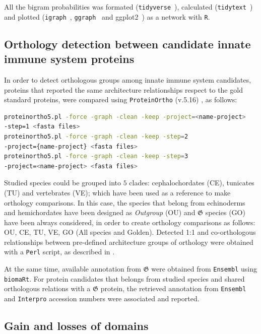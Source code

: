 \documentclass[11pt]{article}
\begin{document}
All the bigram probabilities was formated (\texttt{tidyverse}~\cite{wickham:2017}), calculated 
(\texttt{tidytext}~\cite{Wickham:2016}) and plotted (\texttt{igraph}~\cite{Csardi:2006}, 
\texttt{ggraph}~\cite{Pedersen:2018} and ggplot2~\cite{Wickham:2016a}) as a network with 
\texttt{R}.

\subsection*{Orthology detection between candidate innate immune system 
proteins}
In order to detect orthologous groups among innate immune system candidates, 
proteins that reported the same architecture relationships respect to the gold 
standard proteins, were compared using \texttt{ProteinOrtho} (v.5.16) \cite{Lechner2011}, 
as follows:

\begin{lstlisting}[language=bash, breaklines=true]
proteinortho5.pl -force -graph -clean -keep -project=<name-project> 
-step=1 <fasta files>
proteinortho5.pl -force -graph -clean -keep -step=2 
-project={name-project} <fasta files>
proteinortho5.pl -force -graph -clean -keep -step=3  
-project=<name-project> <fasta files>
\end{lstlisting}

Studied species could be grouped into $5$ clades: cephalochordates (CE),
tunicates (TU) and vertebrates (VE); which have been used as a reference to make
orthology comparisons. In this case, the species that belong
from echinoderms and hemichordates have been designed as \textsl{Outgroup} (OU) and 
$\boldsymbol{\mathfrak{G}}$ species (GO) have been always considered, in order to create 
orthology comparisons as follows: OU, CE, TU, VE, GO (All species and Golden). Detected 1:1 and 
co-orthologous relationships between pre-defined architecture groups of orthology 
were obtained with a \texttt{Perl} script, as described in \cite{Lechner2011}.

At the same time, available annotation from $\boldsymbol{\mathfrak{G}}$ were obtained from 
\texttt{Ensembl} using \texttt{biomaRt}. For protein candidates that belongs from studied 
species and shared orthologous relations with a $\boldsymbol{\mathfrak{G}}$ protein, the 
retrieved annotation from \texttt{Ensembl} and \texttt{Interpro} accession numbers were 
associated and reported.

\subsection*{Gain and losses of domains}
\end{document}
